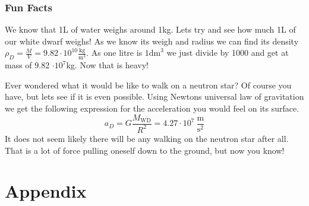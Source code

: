 \documentclass[reprint,english,notitlepage]{revtex4-2}
\begin{document}
\subsubsection*{Fun Facts}
We know that 1L of water weighs around 1kg. Lets try and see how much 1L of our white dwarf weighs! As we know its weigh and radius we can find its density $ ρ_{D}  = \frac{M}{V} = 9.82 ⋅ 10^{10} \frac{\text{kg}}{\text{m}^{3}}$. As one litre is $ 1 \text{dm}^{3} $ we just divide by 1000 and get at mass of 9.82 $ ⋅ 10^{7} $kg. Now that is heavy!

Ever wondered what it would be like to walk on a neutron star? Of course you have, but lets see if it is even possible. Using Newtons universal law of gravitation we get the following expression for the acceleration you would feel on its surface. 
\begin{equation}\label{eq: Dwarf gravity}
  a_D = G \frac{M_\text{WD}}{R^{2}} = 4.27 ⋅ 10^{7} \ \frac{\text{m}}{\text{s}^{2}}
\end{equation}
It does not seem likely there will be any walking on the neutron star after all. That is a lot of force pulling oneself down to the ground, but now you know!
  
\newpage
\phantom
\newpage
\newpage
\onecolumngrid
\section{Appendix} \label{sec: appendix}
\end{document}

